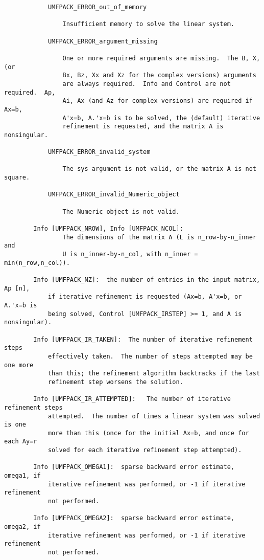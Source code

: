 {\begin{verbatim}
            UMFPACK_ERROR_out_of_memory

                Insufficient memory to solve the linear system.

            UMFPACK_ERROR_argument_missing

                One or more required arguments are missing.  The B, X, (or
                Bx, Bz, Xx and Xz for the complex versions) arguments
                are always required.  Info and Control are not required.  Ap,
                Ai, Ax (and Az for complex versions) are required if Ax=b,
                A'x=b, A.'x=b is to be solved, the (default) iterative
                refinement is requested, and the matrix A is nonsingular.

            UMFPACK_ERROR_invalid_system

                The sys argument is not valid, or the matrix A is not square.

            UMFPACK_ERROR_invalid_Numeric_object

                The Numeric object is not valid.

        Info [UMFPACK_NROW], Info [UMFPACK_NCOL]:
                The dimensions of the matrix A (L is n_row-by-n_inner and
                U is n_inner-by-n_col, with n_inner = min(n_row,n_col)).

        Info [UMFPACK_NZ]:  the number of entries in the input matrix, Ap [n],
            if iterative refinement is requested (Ax=b, A'x=b, or A.'x=b is
            being solved, Control [UMFPACK_IRSTEP] >= 1, and A is nonsingular).

        Info [UMFPACK_IR_TAKEN]:  The number of iterative refinement steps
            effectively taken.  The number of steps attempted may be one more
            than this; the refinement algorithm backtracks if the last
            refinement step worsens the solution.

        Info [UMFPACK_IR_ATTEMPTED]:   The number of iterative refinement steps
            attempted.  The number of times a linear system was solved is one
            more than this (once for the initial Ax=b, and once for each Ay=r
            solved for each iterative refinement step attempted).

        Info [UMFPACK_OMEGA1]:  sparse backward error estimate, omega1, if
            iterative refinement was performed, or -1 if iterative refinement
            not performed.

        Info [UMFPACK_OMEGA2]:  sparse backward error estimate, omega2, if
            iterative refinement was performed, or -1 if iterative refinement
            not performed.


\end{verbatim}}
